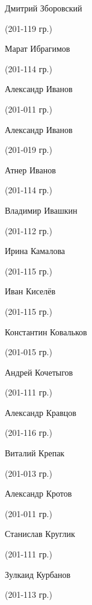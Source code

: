 \begin{multicols}{2}
\begin{small}
\begin{enumerate*}
	\item Дмитрий Зборовский\begin{tiny} (201-119 гр.)\end{tiny}
	\item Марат Ибрагимов\begin{tiny} (201-114 гр.)\end{tiny}
	\item Александр Иванов\begin{tiny} (201-011 гр.)\end{tiny}
	\item Александр Иванов\begin{tiny} (201-019 гр.)\end{tiny}
	\item Атнер Иванов\begin{tiny} (201-114 гр.)\end{tiny}
	\item Владимир Ивашкин\begin{tiny} (201-112 гр.)\end{tiny}
	\item Ирина Камалова\begin{tiny} (201-115 гр.)\end{tiny}
	\item Иван Киселёв\begin{tiny} (201-115 гр.)\end{tiny}
	\item Константин Ковальков\begin{tiny} (201-015 гр.)\end{tiny}
	\item Андрей Кочетыгов\begin{tiny} (201-111 гр.)\end{tiny}
	\item Александр Кравцов\begin{tiny} (201-116 гр.)\end{tiny}
	\item Виталий Крепак\begin{tiny} (201-013 гр.)\end{tiny}
	\item Александр Кротов\begin{tiny} (201-011 гр.)\end{tiny}
	\item Станислав Круглик\begin{tiny} (201-111 гр.)\end{tiny}
	\item Зулкаид Курбанов\begin{tiny} (201-113 гр.)\end{tiny}

\end{enumerate*}
\end{small}
\end{multicols}
